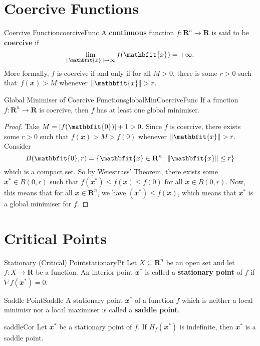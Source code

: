\documentclass[math, code]{amznotes}
\theoremstyle{remark}
\begin{document}
\section{Coercive Functions}
\begin{dfnbox}{Coercive Function}{coerciveFunc}
    A {\color{red} \textbf{continuous}} function $f \colon \mathbf{R}^n \to \mathbf{R}$ is said to be {\color{red} \textbf{coercive}} if
    \begin{equation*}
        \lim_{\norm{\mathbfit{x}} \to \infty} f(\mathbfit{x}) = +\infty.
    \end{equation*}
    More formally, $f$ is coercive if and only if for all $M > 0$, there is some $r > 0$ such that~$f(\mathbfit{x}) > M$ whenever $\norm{\mathbfit{x}} > r$.
\end{dfnbox}
\begin{thmbox}{Global Minimiser of Coercive Functions}{globalMinCoerciveFunc}
    If a function $f \colon \mathbf{R}^n \to \mathbf{R}$ is coercive, then $f$ has at least one global minimiser.
    \tcblower   
    \begin{proof}
        Take $M = \abs{f(\mathbfit{0})} + 1 > 0$. Since $f$ is coercive, there exists some $r > 0$ such that $f(\mathbfit{x}) > M > f(\mathbfit{0})$ whenever $\norm{\mathbfit{x}} > r$. Consider
        \begin{displaymath}
            B(\mathbfit{0}, r) = \left\{\mathbfit{x} \in \mathbf{R}^n \colon \norm{\mathbfit{x}} \leq r\right\}
        \end{displaymath}
        which is a compact set. So by Weiestrass' Theorem, there exists some $\mathbfit{x}^* \in B(\mathbfit{0}, r)$ such that $f(\mathbfit{x}^*) \leq f(\mathbfit{x}) \leq f(\mathbfit{0})$ for all $\mathbfit{x} \in B(\mathbfit{0}, r)$. Now, this means that for all $\mathbfit{x} \in \mathbf{R}^n$, we have $(\mathbfit{x}^*) \leq f(\mathbfit{x})$, which means that $\mathbfit{x}^*$ is a global minimiser for $f$.
    \end{proof}
\end{thmbox}
\section{Critical Points}
\begin{dfnbox}{Stationary (Critical) Point}{stationaryPt}
    Let $X \subseteq \mathbf{R}^n$ be an open set and let $f \colon X \to \mathbf{R}$ be a function. An interior point $\mathbfit{x}^*$ is called a {\color{red} \textbf{stationary point}} of $f$ if $\nabla f(\mathbfit{x}^*) = \mathbfit{0}$.
\end{dfnbox}
\begin{dfnbox}{Saddle Point}{Saddle}
    A stationary point $\mathbfit{x}^*$ of a function $f$ which is neither a local minimisr nor a local maximiser is called a {\color{red} \textbf{saddle point}}.
\end{dfnbox}
\begin{corbox}{}{saddleCor}
    Let $\mathbfit{x}^*$ be a stationary point of $f$. If $H_f(\mathbfit{x}^*)$ is indefinite, then $\mathbfit{x}^*$ is a saddle point.
\end{corbox}
\end{document}
